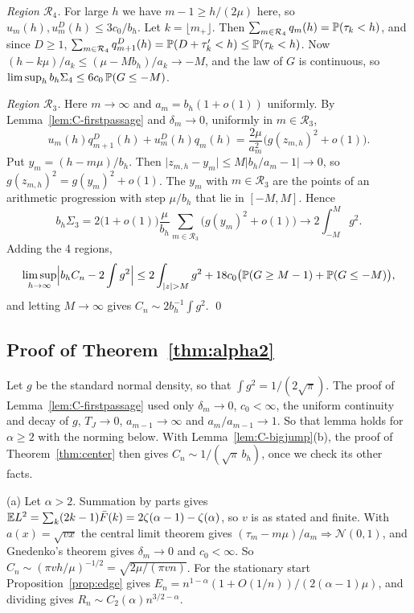 \emph{Region $\mathcal R_4$.} For large $h$ we have $m-1\ge h/(2\mu)$ here, so
$u_m(h),u^D_m(h)\le3c_0/b_h$. Let $k=\lfloor m_+\rfloor$. Then
$\sum_{m\in\mathcal R_4}q_m(h)=\mathbb{P}(\tau_k<h)$, and since $D\ge1$,
$\sum_{m\in\mathcal R_4}q^D_{m+1}(h)=\mathbb{P}(D+\tau'_k<h)\le\mathbb{P}(\tau_k<h)$.
Now $(h-k\mu)/a_k\le(\mu-Mb_h)/a_k\to-M$, and the law of $G$ is continuous,
so $\limsup_hb_h\Sigma_4\le6c_0\,\mathbb{P}(G\le-M)$.

\emph{Region $\mathcal R_3$.} Here $m\to\infty$ and $a_m=b_h(1+o(1))$
uniformly. By Lemma~\ref{lem:C-firstpassage} and $\delta_m\to0$, uniformly in
$m\in\mathcal R_3$,
\[
u_m(h)q^D_{m+1}(h)+u^D_m(h)q_m(h)=\frac{2\mu}{a_m^2}\bigl(g(z_{m,h})^2+o(1)\bigr).
\]
Put $y_m=(h-m\mu)/b_h$. Then $\lvert z_{m,h}-y_m\rvert\le M\lvert
b_h/a_m-1\rvert\to0$, so $g(z_{m,h})^2=g(y_m)^2+o(1)$. The $y_m$ with
$m\in\mathcal R_3$ are the points of an arithmetic progression with step
$\mu/b_h$ that lie in $[-M,M]$. Hence
\[
b_h\Sigma_3=2\bigl(1+o(1)\bigr)\frac\mu{b_h}
\sum_{m\in\mathcal R_3}\bigl(g(y_m)^2+o(1)\bigr)\to2\int_{-M}^Mg^2 .
\]
Adding the 4 regions,
\[
\limsup_{h\to\infty}\Bigl\lvert b_hC_n-2\int g^2\Bigr\rvert
\le2\int_{\lvert z\rvert>M}g^2+18c_0\bigl(\mathbb{P}(G\ge M-1)+\mathbb{P}(G\le-M)\bigr),
\]
and letting $M\to\infty$ gives $C_n\sim2b_h^{-1}\int g^2$.
\qed

\subsection{Proof of Theorem~\texorpdfstring{\ref{thm:alpha2}}{4.6}}

Let $g$ be the standard normal density, so that $\int g^2=1/(2\sqrt\pi)$. The
proof of Lemma~\ref{lem:C-firstpassage} used only $\delta_m\to0$,
$c_0<\infty$, the uniform continuity and decay of $g$, $T_J\to0$,
$a_{m-1}\to\infty$ and $a_m/a_{m-1}\to1$. So that lemma holds for $\alpha\ge2$ with the norming
below. With Lemma~\ref{lem:C-bigjump}(b), the proof of
Theorem~\ref{thm:center} then gives $C_n\sim1/(\sqrt\pi\,b_h)$, once we check
its other facts.

(a) Let $\alpha>2$. Summation by parts gives
$\mathbb{E} L^2=\sum_k(2k-1)\bar F(k)=2\zeta(\alpha-1)-\zeta(\alpha)$, so $v$ is as
stated and finite. With $a(x)=\sqrt{vx}$ the central limit theorem gives
$(\tau_m-m\mu)/a_m\Rightarrow\mathcal N(0,1)$, and Gnedenko's theorem
\cite[Theorem~4.2.1]{ibragimovlinnik1971} gives $\delta_m\to0$ and
$c_0<\infty$. So $C_n\sim(\pi vh/\mu)^{-1/2}=\sqrt{2\mu/(\pi vn)}$. For the
stationary start Proposition~\ref{prop:edge} gives
$E_n=n^{1-\alpha}(1+O(1/n))/(2(\alpha-1)\mu)$, and dividing gives
$R_n\sim C_2(\alpha)n^{3/2-\alpha}$.

